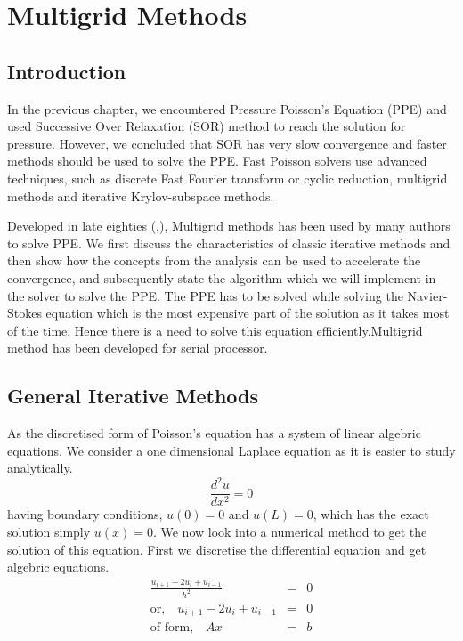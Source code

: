 \chapter{Multigrid Methods}

\section{Introduction}
In the previous chapter, we encountered Pressure Poisson's Equation (PPE) and used Successive Over Relaxation (SOR) method to reach the solution for pressure.
However, we concluded that SOR has very slow convergence and faster methods should be used to solve the PPE.  Fast Poisson solvers use advanced techniques, 
such as discrete Fast Fourier transform or cyclic reduction, multigrid methods and iterative Krylov-subspace methods. \par
Developed in late eighties (\cite{wesseling1995introduction},\cite{briggs2000multigrid}), Multigrid methods has been used by many authors to solve PPE. We first discuss the characteristics of 
classic iterative methods and then show how the concepts from the analysis can be used to accelerate the convergence, and subsequently state the algorithm which we will 
implement in the solver to solve the PPE. The PPE has to be solved while solving the Navier-Stokes equation which is the most expensive 
part of the solution as it takes most of the time. Hence there is a need to solve this equation efficiently.Multigrid method has been developed for serial processor.

\section{General Iterative Methods}

As the discretised form of Poisson's equation has a system of linear algebric equations. We consider a one dimensional Laplace equation as it is easier to study
analytically. 
\begin{equation}
\frac{d^2u}{dx^2} = 0
\end{equation}
having boundary conditions,
$u(0)=0$ and $u(L) = 0$, which has the exact solution simply $u(x) = 0$. We now look into a numerical method to get the solution of this equation. First we
discretise the differential equation and get algebric equations.
\begin{equation}
\begin{align}
 \frac{u_{i+1}-2u_{i}+u_{i-1}}{h^2} &=& 0 \\
 \text{or,}\quad u_{i+1}-2u_{i}+u_{i-1} &=& 0 \\
 \text{of form,}\quad Ax&=&b
 \end{align}
 \label{E1}
\end{equation}

